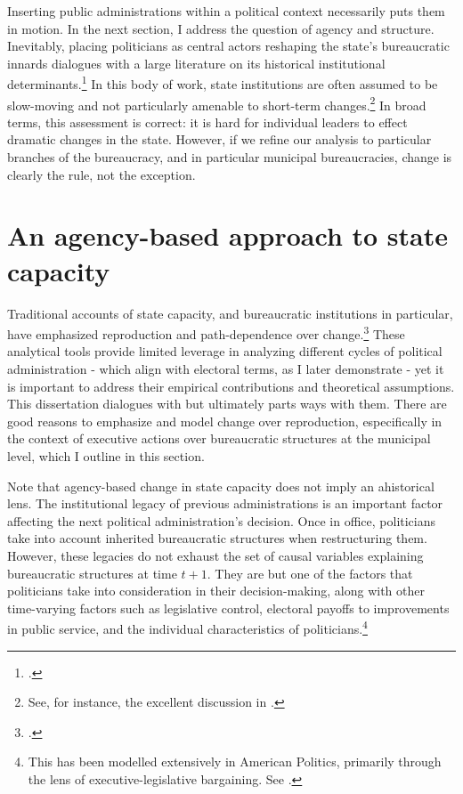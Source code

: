 \documentclass[12pt,]{book}
\let\rmarkdownfootnote\footnote%
\def\footnote{\protect\rmarkdownfootnote}
\begin{document}
Inserting public administrations within a political context necessarily puts them in motion. In the next section, I address the question of agency and structure. Inevitably, placing politicians as central actors reshaping the state's bureaucratic innards dialogues with a large literature on its historical institutional determinants.\footnote{\citet{skocpol_bringing_1985}.} In this body of work, state institutions are often assumed to be slow-moving and not particularly amenable to short-term changes.\footnote{See, for instance, the excellent discussion in \citet{centeno_unpacking_2017}.} In broad terms, this assessment is correct: it is hard for individual leaders to effect dramatic changes in the state. However, if we refine our analysis to particular branches of the bureaucracy, and in particular municipal bureaucracies, change is clearly the rule, not the exception.

\hypertarget{an-agency-based-approach-to-state-capacity}{%
\section{An agency-based approach to state capacity}\label{an-agency-based-approach-to-state-capacity}}

Traditional accounts of state capacity, and bureaucratic institutions in particular, have emphasized reproduction and path-dependence over change.\footnote{\citet{pierson_increasing_2000}.} These analytical tools provide limited leverage in analyzing different cycles of political administration - which align with electoral terms, as I later demonstrate - yet it is important to address their empirical contributions and theoretical assumptions. This dissertation dialogues with but ultimately parts ways with them. There are good reasons to emphasize and model change over reproduction, especifically in the context of executive actions over bureaucratic structures at the municipal level, which I outline in this section.

Note that agency-based change in state capacity does not imply an ahistorical lens. The institutional legacy of previous administrations is an important factor affecting the next political administration's decision. Once in office, politicians take into account inherited bureaucratic structures when restructuring them. However, these legacies do not exhaust the set of causal variables explaining bureaucratic structures at time \(t + 1\). They are but one of the factors that politicians take into consideration in their decision-making, along with other time-varying factors such as legislative control, electoral payoffs to improvements in public service, and the individual characteristics of politicians.\footnote{This has been modelled extensively in American Politics, primarily through the lens of executive-legislative bargaining. See \citet{huber_bureaucratic_2004}.}
\end{document}
